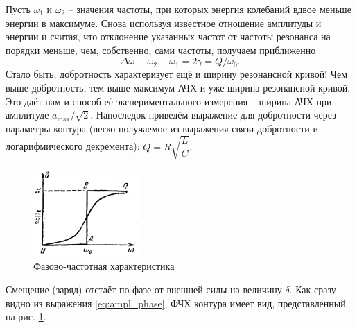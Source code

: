 \documentclass{../lab_class}
\begin{document}
Пусть $\omega_1$ и $\omega_2$ -- значения частоты, при которых энергия колебаний вдвое меньше энергии в максимуме. Снова используя известное отношение амплитуды и энергии и считая, что отклонение указанных частот от частоты резонанса на порядки меньше, чем, собственно, сами частоты, получаем приближенно
\begin{equation*}
	\Delta \omega \equiv \omega_2 - \omega_1 = 2 \gamma = Q / \omega_0.
\end{equation*}
Стало быть, добротность характеризует ещё и ширину резонансной кривой! Чем выше добротность, тем выше максимум АЧХ и уже ширина резонансной кривой. Это даёт нам и способ её экспериментального измерения -- ширина АЧХ при амплитуде $a_{\max}/\sqrt{2}$. Напоследок приведём выражение для добротности через параметры контура (легко получаемое из выражения связи добротности и логарифмического декремента): $Q = R \sqrt{\dfrac{L}{C}}$.

\begin{figure}
	\centering
	\includegraphics[width=4cm]{freq_curve.png}
	\caption{Фазово-частотная характеристика}
	\label{fig:phase_resp}
\end{figure}

Смещение (заряд) отстаёт по фазе от внешней силы на величину $\delta$. Как сразу видно из выражения \ref{eq:ampl_phase}, ФЧХ контура имеет вид, представленный на рис. \ref{fig:phase_resp}.
\end{document}
